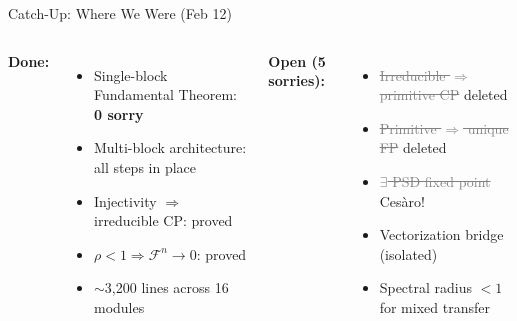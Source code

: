 \documentclass[aspectratio=169,10pt]{beamer}
\begin{document}
\begin{frame}{Catch-Up: Where We Were (Feb 12)}
    \vspace{-0.3em}

    \begin{columns}[T]
        \textbf{\textcolor{leangreen}{Done:}}
        \begin{itemize}\itemsep0.1em\small
            \item Single-block Fundamental Theorem: \textcolor{leangreen}{\textbf{0 sorry}}
            \item Multi-block architecture: all steps in place
            \item Injectivity $\Rightarrow$ irreducible CP: proved
            \item $\rho < 1 \Rightarrow \mathcal{F}^n \to 0$: proved
            \item $\sim$3{,}200 lines across 16 modules
        \end{itemize}

        \textbf{\textcolor{softred}{Open (5 sorries):}}
        \begin{itemize}\itemsep0.1em\small
            \item[\textcolor{gray}{\sout{1.}}] \textcolor{gray}{\sout{Irreducible $\Rightarrow$ primitive CP}}
                {\tiny\textcolor{leangreen}{deleted}}
            \item[\textcolor{gray}{\sout{2.}}] \textcolor{gray}{\sout{Primitive $\Rightarrow$ unique FP}}
                {\tiny\textcolor{leangreen}{deleted}}
            \item[\textcolor{gray}{\sout{3.}}] \textcolor{gray}{\sout{$\exists$ PSD fixed point}}
                {\tiny\textcolor{leangreen}{Ces\`aro!}}
            \item[\textcolor{softred}{4.}] Vectorization bridge (isolated)
            \item[\textcolor{softred}{5.}] Spectral radius $< 1$ for mixed transfer
        \end{itemize}
    \end{columns}

    \vspace{0.5em}
    \begin{center}
    \end{center}
\end{frame}
\end{document}
